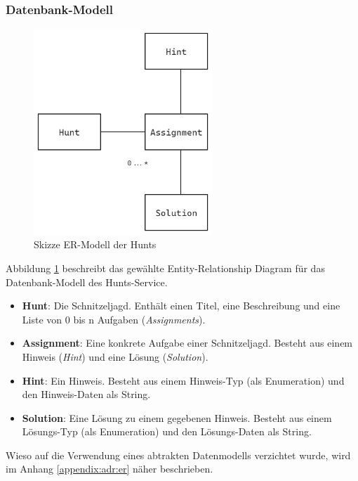 \subsubsection{Datenbank-Modell}

\begin{figure}[H]
    \centering
    \includegraphics[width=0.6\textwidth]{images/PrAr-Software-Entwurf-Hunt-Api-Hunt-Service-Er.png}
    \caption{Skizze ER-Modell der Hunts}
    \label{fig:swentwurf:huntapi:huntservice:er}
\end{figure}

Abbildung \ref{fig:swentwurf:huntapi:huntservice:er} beschreibt das gewählte Entity-Relationship Diagram für das Datenbank-Modell des Hunts-Service.

\begin{itemize}
    \item \textbf{Hunt}: Die Schnitzeljagd. Enthält einen Titel, eine Beschreibung und eine Liste von 0 bis n Aufgaben (\textit{Assignments}).
    \item \textbf{Assignment}: Eine konkrete Aufgabe einer Schnitzeljagd. Besteht aus einem Hinweis (\textit{Hint}) und eine Lösung (\textit{Solution}).
    \item \textbf{Hint}: Ein Hinweis. Besteht aus einem Hinweis-Typ (als Enumeration) und den Hinweis-Daten als String.
    \item \textbf{Solution}: Eine Lösung zu einem gegebenen Hinweis. Besteht aus einem Lösungs-Typ (als Enumeration) und den Lösungs-Daten als String.
\end{itemize}

Wieso auf die Verwendung eines abtrakten Datenmodells verzichtet wurde, wird im Anhang \ref{appendix:adr:er} näher beschrieben.

